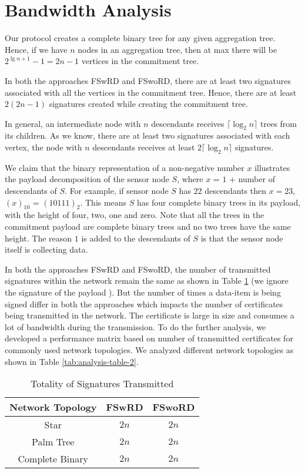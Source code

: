 	\section{Bandwidth Analysis}

		Our protocol creates a complete binary tree for any given aggregation tree.
		Hence, if we have $n$ nodes in an aggregation tree, then at max there will be $2^{\lg n + 1} - 1 = 2n-1$ vertices in the commitment tree.

		In both the approaches FSwRD and FSwoRD, there are at least two signatures associated with all the vertices in the commitment tree.
		Hence, there are at least $2(2n-1)$ signatures created while creating the commitment tree.

		In general, an intermediate node with $n$ descendants receives $\lceil \log_2 n \rceil$ trees from its children.
		As we know, there are at least two signatures associated with each vertex, the node with $n$ descendants receives at least $2 \lceil \log_2 n \rceil $ signatures.

		We claim that the binary representation of a non-negative number $x$ illustrates the payload decomposition of the sensor node $S$, where $x$ = $1$ + number of descendants of $S$.
		For example, if sensor node $S$ has $22$ descendants then $x =23$, $(x)_{10}$ = $(10111)_{2}$. 
		This means $S$ has four complete binary trees in its payload, with the height of four, two, one and zero.
		Note that all the trees in the commitment payload are complete binary trees and no two trees have the same height.
		The reason $1$ is added to the descendants of $S$ is that the sensor node itself is collecting data.

		In both the approaches FSwRD and FSwoRD, the number of transmitted signatures within the network remain the same as shown in Table \ref{tab:analysis-table-1} (we ignore the signature of the payload ). 
		But the number of times a data-item is being signed differ in both the approaches which impacts the number of certificates being transmitted in the network.
		The certificate is large in size and consumes a lot of bandwidth during the transmission.
		To do the further analysis, we developed a performance matrix based on number of transmitted certificates for commonly used network topologies.
		We analyzed different network topologies as shown in Table \ref{tab:analysis-table-2}. 
		
		\begin{table}[!htb]
			\begin{center}
				\caption{Totality of Signatures Transmitted}
				\label{tab:analysis-table-1}
				\begin{tabular}{|c||c|c|}
					\hline
					Network Topology & FSwRD & FSwoRD \\ 
					\hline
					\hline
					Star & $2n$ & $2n$ \\
					\hline
					Palm Tree & $2n$ & $2n$\\
					\hline
					Complete Binary & $2n$ & $2n$\\
					\hline
				\end{tabular}
			\end{center}
		\end{table}

